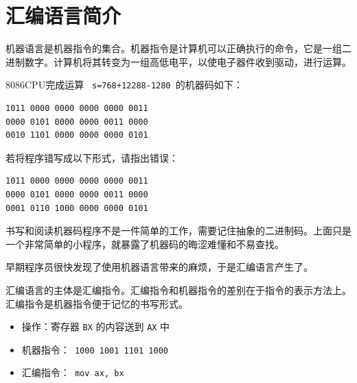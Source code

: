 \section{汇编语言简介}

\begin{frame}
机器语言是机器指令的集合。机器指令是计算机可以正确执行的命令，它是一组二进制数字。计算机将其转变为一组高低电平，以使电子器件收到驱动，进行运算。
\end{frame}

\begin{frame}[fragile]
8086CPU完成运算 \lstinline| s=768+12288-1280 |的机器码如下：
\begin{lstlisting}[frame=no]
1011 0000 0000 0000 0000 0011 
0000 0101 0000 0000 0011 0000 
0010 1101 0000 0000 0000 0101
\end{lstlisting}

\pause
若将程序错写成以下形式，请指出错误：
\begin{lstlisting}[frame=no]
1011 0000 0000 0000 0000 0011 
0000 0101 0000 0000 0011 0000 
0001 0110 1000 0000 0000 0101
\end{lstlisting}

\end{frame}

\begin{frame}
书写和阅读机器码程序不是一件简单的工作，需要记住抽象的二进制码。上面只是一个非常简单的小程序，就暴露了机器码的晦涩难懂和不易查找。\vspace{0.1in}

早期程序员很快发现了使用机器语言带来的麻烦，于是汇编语言产生了。

\end{frame}

\begin{frame}\ft{\secname}
汇编语言的主体是汇编指令。汇编指令和机器指令的差别在于指令的表示方法上。{汇编指令是机器指令便于记忆的书写形式。} \pause \vspace{0.1in}

\begin{itemize}
\item[]
操作：寄存器 \lstinline|BX| 的内容送到 \lstinline|AX| 中\\
\item[]
机器指令：\lstinline| 1000 1001 1101 1000|\\
\item[]
汇编指令：\lstinline| mov ax, bx |
\end{itemize}
\end{frame}


